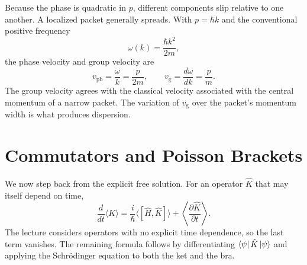 Because the phase is quadratic in \(p\), different components slip relative
to one another. A localized packet generally spreads. With
\(p=\hbar k\) and the conventional positive frequency
\begin{equation}
  \omega(k)=\frac{\hbar k^2}{2m},
\end{equation}
the phase velocity and group velocity are
\begin{equation}
  v_{\mathrm{ph}}=\frac{\omega}{k}=\frac{p}{2m},
  \qquad
  v_{\mathrm g}=\frac{d\omega}{dk}=\frac{p}{m}.
  \label{eq:l9-wave-velocities}
\end{equation}
The group velocity agrees with the classical velocity associated with the
central momentum of a narrow packet. The variation of \(v_{\mathrm g}\) over
the packet's momentum width is what produces dispersion.

\begin{classroomqa}
\end{classroomqa}

\begin{classroomqa}
\end{classroomqa}

\section{Commutators and Poisson Brackets}

We now step back from the explicit free solution. For an operator \(\hat K\)
that may itself depend on time,
\begin{equation}
  \frac{d}{dt}\langle K\rangle
  =
  \frac{i}{\hbar}\langle[\hat H,\hat K]\rangle
  +
  \left\langle\frac{\partial\hat K}{\partial t}\right\rangle.
  \label{eq:l9-expectation-evolution}
\end{equation}
The lecture considers operators with no explicit time dependence, so the
last term vanishes. The remaining formula follows by differentiating
\(\left\langle\psi\right\rvert\hat K\left\lvert\psi\right\rangle\) and applying the Schr\"odinger equation to
both the ket and the bra.


